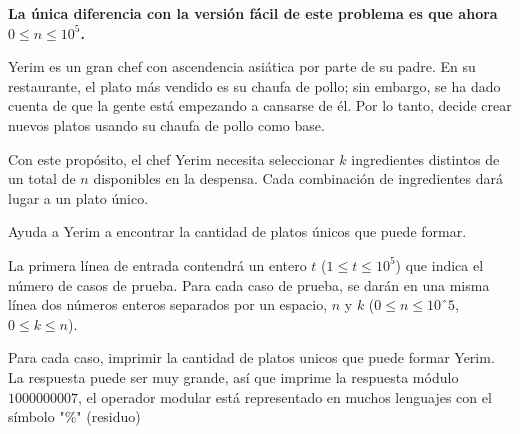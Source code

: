 
\textbf{La única diferencia con la versión fácil de este problema es que ahora~$0 \leq n \leq 10^5$.}

Yerim es un gran chef con ascendencia asiática por parte de su padre. En su restaurante, el plato más vendido es su chaufa de pollo; sin embargo, se ha dado cuenta de que la gente está empezando a cansarse de él. Por lo tanto, decide crear nuevos platos usando su chaufa de pollo como base.

Con este propósito, el chef Yerim necesita seleccionar $k$ ingredientes distintos de un total de $n$ disponibles en la despensa. Cada combinación de ingredientes dará lugar a un plato único.

Ayuda a Yerim a encontrar la cantidad de platos únicos que puede formar.


La primera línea de entrada contendrá un entero $t$ ($1\leq t \leq 10^5$) que indica el número de casos de prueba. Para cada caso de prueba, se darán en una misma línea dos números enteros separados por un espacio, $n$ y $k$ ($0 \leq n \leq 10ˆ5$, $0 \leq k \leq n$).

\outputText

Para cada caso, imprimir la cantidad de platos unicos que puede formar Yerim.\\
La respuesta puede ser muy grande, así que imprime la respuesta módulo $1000000007$, el operador modular está representado en muchos lenguajes con el símbolo "\%" (residuo)

\exampleCases

\begin{example}
\end{example}
